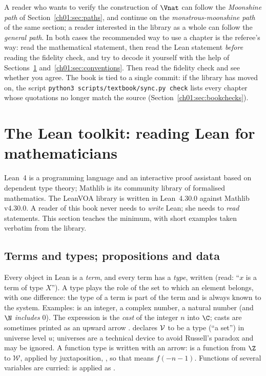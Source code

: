 A reader who wants to verify the construction of $\Vnat$ can follow the \emph{Moonshine path} of
Section~\ref{ch01:sec:paths}, and continue on the \emph{monstrous-moonshine path} of the same section; a reader interested in the library as a whole can follow the
\emph{general path}. In both cases the recommended way to use a chapter is the referee's way: read
the mathematical statement, then read the Lean statement \emph{before} reading the fidelity check,
and try to decode it yourself with the help of Sections~\ref{ch01:sec:lean}
and~\ref{ch01:sec:conventions}. Then read the fidelity check and see whether you agree. The book is
tied to a single commit: if the library has moved on, the script
\texttt{python3 scripts/textbook/sync.py check} lists every chapter whose quotations no longer match
the source (Section~\ref{ch01:sec:bookchecks}).

\section{The Lean toolkit: reading Lean for mathematicians}\label{ch01:sec:lean}

Lean~4 is a programming language and an interactive proof assistant based on dependent type
theory; Mathlib is its community library of formalised mathematics. The LeanVOA library is written
in Lean~4.30.0 against Mathlib v4.30.0. A reader of this book never needs to \emph{write} Lean; she
needs to \emph{read} statements. This section teaches the minimum, with short examples taken
verbatim from the library.

\subsection{Terms and types; propositions and data}

Every object in Lean is a \emph{term}, and every term has a \emph{type}, written  (read:
``$x$ is a term of type $X$''). A type plays the role of the set to which an element belongs, with
one difference: the type of a term is part of the term and is always known to the system. Examples:
 is an integer,  a complex number,  a natural number (and
$\N$ \emph{includes} $0$). The expression  is the \emph{cast} of the integer $n$ into
$\C$; casts are sometimes printed as an upward arrow .  declares $\mathcal{V}$
to be a type (``a set'') in universe level $u$; universes are a technical device to avoid Russell's
paradox and may be ignored. A function type is written with an arrow:  is a
function from $\Z$ to $\mathcal W$, applied by juxtaposition, , so that 
means $f(-n-1)$. Functions of several variables are curried:  is applied as
.


